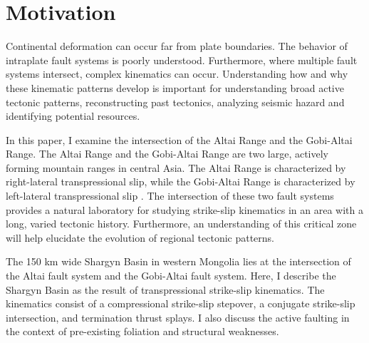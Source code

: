 \section{Motivation}
	Continental deformation can occur far from plate boundaries. The behavior of intraplate fault systems is poorly understood. Furthermore, where multiple fault systems intersect, complex kinematics can occur. Understanding how and why these kinematic patterns develop is important for understanding broad active tectonic patterns, reconstructing past tectonics, analyzing seismic hazard and identifying potential resources. 

	In this paper, I examine the intersection of the Altai Range and the Gobi-Altai Range. The Altai Range and the Gobi-Altai Range are two large, actively forming mountain ranges in central Asia. The Altai Range is characterized by right-lateral transpressional slip, while the Gobi-Altai Range is characterized by left-lateral transpressional slip \citep{Cunningham2005a}\citep{Cunningham2010}. The intersection of these two fault systems provides a natural laboratory for studying strike-slip kinematics in an area with a long, varied tectonic history. Furthermore, an understanding of this critical zone will help elucidate the evolution of regional tectonic patterns.

	The 150 km wide Shargyn Basin in western Mongolia lies at the intersection of the Altai fault system and the Gobi-Altai fault system. Here, I describe the Shargyn Basin as the result of transpressional strike-slip kinematics. The kinematics consist of a compressional strike-slip stepover, a conjugate strike-slip intersection, and termination thrust splays. I also discuss the active faulting in the context of pre-existing foliation and structural weaknesses.

